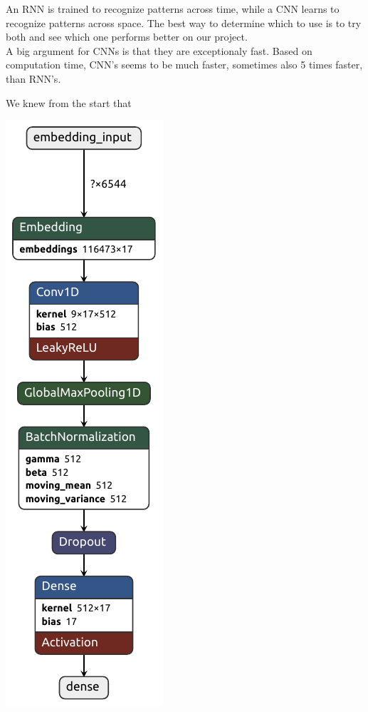 An RNN is trained to recognize patterns across time, while a CNN learns to recognize patterns across space. The best way to determine which to use is to try both and see which one performs better on our project. \\
A big argument for CNNs is that they are exceptionaly fast. Based on computation time, CNN's seems to be much faster, sometimes also 5 times faster, than RNN's.
 











We knew from the start that 

\begin{minipage}{0.48\linewidth}
	\centering
	\includegraphics[height=0.9\textheight]{Images/model_level_1.keras.pdf}
\end{minipage}\hfill
